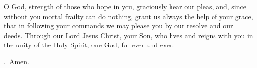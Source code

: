 \lettrine[lines=3]{O}{} God, strength of those who hope in you,
graciously hear our pleas,
and, since without you mortal frailty can do nothing,
grant us always the help of your grace,
that in following your commands
we may please you by our resolve and our deeds.
Through our Lord Jesus Christ, your Son,
who lives and reigns with you in the unity of the Holy Spirit,
one God, for ever and ever. \par \Rbar.~Amen.

